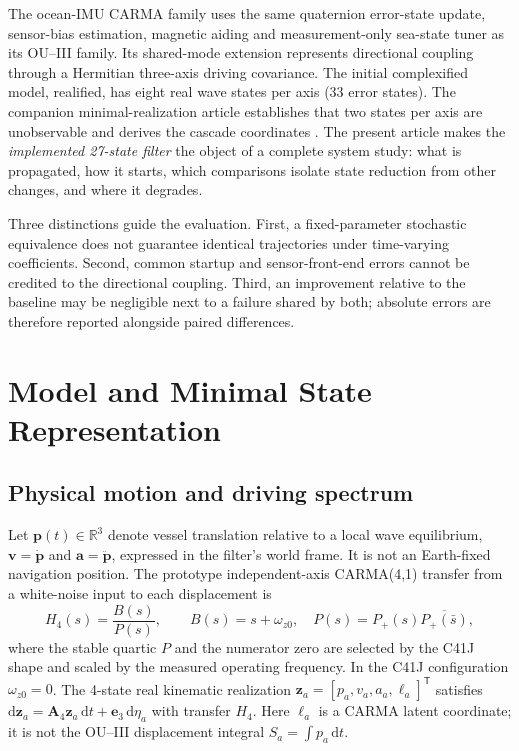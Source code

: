\documentclass[conference]{IEEEtran}
\newcommand{\vct}[1]{\bm{#1}}
\newcommand{\mat}[1]{\bm{#1}}
\newcommand{\R}{\mathbb R}
\newcommand{\T}{^{\mathsf T}}
\begin{document}
The ocean-IMU CARMA family uses the same quaternion error-state update,
sensor-bias estimation, magnetic aiding and measurement-only sea-state
tuner as its OU--III family. Its shared-mode extension represents directional
coupling through a Hermitian three-axis driving covariance. The initial
complexified model, realified, has eight real wave states per axis (33 error
states). The companion minimal-realization article establishes that two
states per axis are unobservable and derives the cascade coordinates
\cite{kalman63,linpicci15}. The present article makes the
\emph{implemented 27-state filter} the object of a complete system study:
what is propagated, how it starts, which comparisons isolate state reduction
from other changes, and where it degrades.

Three distinctions guide the evaluation. First, a fixed-parameter
stochastic equivalence does not guarantee identical trajectories under
time-varying coefficients. Second, common startup and sensor-front-end
errors cannot be credited to the directional coupling. Third, an
improvement relative to the baseline may be negligible next to a failure
shared by both; absolute errors are therefore reported alongside paired
differences.

\section{Model and Minimal State Representation}
\label{sec:model}
\subsection{Physical motion and driving spectrum}
Let $\vct p(t)\in\R^3$ denote vessel translation relative to a local wave
equilibrium, $\vct v=\dot{\vct p}$ and $\vct a=\ddot{\vct p}$, expressed in
the filter's world frame. It is not an Earth-fixed navigation position.
The prototype independent-axis CARMA(4,1) transfer from a white-noise input
to each displacement is
\begin{equation}
 H_4(s)=\frac{B(s)}{P(s)},\qquad B(s)=s+\omega_{z0},\quad
 P(s)=P_+(s)\overline{P_+(\bar s)},
 \label{eq:H4}
\end{equation}
where the stable quartic $P$ and the numerator zero are selected by the
C41J shape and scaled by the measured operating frequency. In the C41J
configuration $\omega_{z0}=0$. The 4-state real kinematic realization
$\vct z_a=[p_a,v_a,a_a,\ell_a]\T$ satisfies
$\mathrm d\vct z_a=\mat A_4\vct z_a\,\mathrm dt+
\vct e_3\,\mathrm d\eta_a$ with transfer $H_4$.
Here $\ell_a$ is a CARMA latent coordinate; it is not the OU--III
displacement integral $S_a=\int p_a\,\mathrm dt$.
\end{document}
